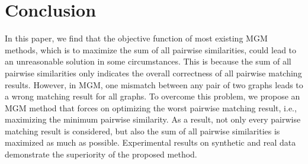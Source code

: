 \section{Conclusion}
In this paper, we find that the objective function of most existing MGM methods, which is to maximize the sum of all pairwise similarities, could lead to an unreasonable solution in some circumstances. This is because the sum of all pairwise similarities only indicates the overall correctness of all pairwise matching results. However, in MGM, one mismatch between any pair of two graphs leads to a wrong matching result for all graphs. To overcome this problem, we propose an MGM method that forces on optimizing the worst pairwise matching result, i.e., maximizing the minimum pairwise similarity. As a result, not only every pairwise matching result is considered, but also the sum of all pairwise similarities is maximized as much as possible. Experimental results on synthetic and real data demonstrate the superiority of the proposed method.